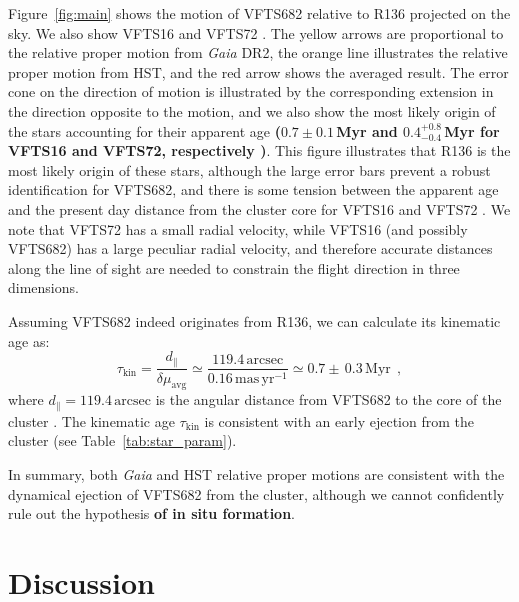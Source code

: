 \documentclass[a4paper,fleqn,usenatbib]{mnras}
\newcommand{\newtext}[1]{{\color{ForestGreen}\bf{#1}}}
\newcommand{\masyr}{\,\mathrm{mas}\,\mathrm{yr}^{-1}}
\DeclareRobustCommand{\Tabref}[1]{Table~\ref{#1}}
\begin{document}
Figure~\ref{fig:main} shows the motion of VFTS682 relative to R136
projected on the
sky. We also show VFTS16 and VFTS72 %
\citep[see][]{lennon:18}. The yellow arrows are proportional to
the relative proper motion from \emph{Gaia} DR2, the orange
line illustrates the relative proper motion from HST, and the 
red arrow shows the averaged result. The error cone
on the direction of motion is illustrated by the corresponding
extension in the direction opposite to the motion, and we also show
the most likely origin of the stars accounting for their apparent age
\newtext{($0.7\pm0.1$\,Myr and $0.4^{+0.8}_{-0.4}$\,Myr for VFTS16 and VFTS72,
respectively \citealt{schneider:18})}.
This figure illustrates that R136 is the most likely origin of these stars, although the large error bars
prevent a robust identification for VFTS682, and there is some tension
between the apparent age and the present day distance from the cluster
core for VFTS16 and VFTS72 \citep[][]{lennon:18}. We note that
VFTS72 has a small radial velocity, while VFTS16 (and possibly VFTS682) has
a large peculiar radial velocity, and therefore accurate distances along
the line of sight are
needed to constrain the flight direction in three dimensions.


Assuming VFTS682 indeed originates from R136, we can calculate its kinematic
age as:
\begin{equation}
  \label{eq:kin_age}
  \tau_\mathrm{kin} = \frac{d_\parallel}{\delta\mu_\mathrm{avg}} \simeq
  \frac{119.4\,\mathrm{arcsec}}{0.16\masyr} \simeq 0.7\pm\,0.3\, \mathrm{Myr} \ \ ,
\end{equation}
where $d_\parallel = 119.4\,\mathrm{arcsec}$ is the angular distance from VFTS682 to
the core of the cluster \citep[][]{bestenlehner:11}. %
The kinematic age $\tau_\mathrm{kin}$ is consistent with an early
ejection from the cluster (see \Tabref{tab:star_param}).

In summary, both \emph{Gaia} and HST relative proper motions are consistent with the dynamical ejection of
VFTS682 from the cluster, although we cannot confidently rule out the
hypothesis \newtext{of in situ formation}. 
\vspace*{-20pt}
\section{Discussion}
\label{sec:discussion}
\end{document}
